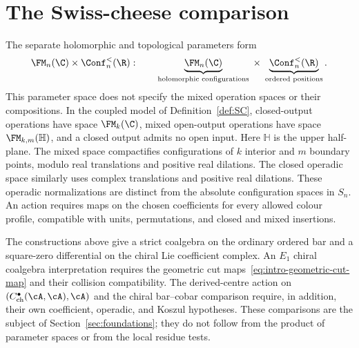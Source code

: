 \section*{The Swiss-cheese comparison}

The separate holomorphic and topological parameters form
\[
 \FM_n(\C) \times \Conf_n^<(\R):
 \qquad
 \underbrace{\FM_n(\C)}_{\text{holomorphic configurations}}
 \;\times\;
 \underbrace{\Conf_n^<(\R)}_{\text{ordered positions}}.
\]
This parameter space does not specify the mixed operation spaces
or their compositions. In the coupled model of
Definition~\ref{def:SC}, closed-output operations have space
$\FM_k(\C)$, mixed open-output operations have space
$\FM_{k,m}(\mathbb H)$, and a closed output admits no open input.
Here $\mathbb H$ is the upper half-plane. The mixed space
compactifies configurations of $k$ interior and $m$ boundary
points, modulo real translations and positive real dilations.
The closed operadic space similarly uses complex translations
and positive real dilations. These operadic normalizations
are distinct from the absolute configuration spaces in $S_n$.
An action requires maps on the chosen coefficients for every
allowed colour profile, compatible with units, permutations,
and closed and mixed insertions.

The constructions above give a strict coalgebra on the ordinary
ordered bar and a square-zero differential on the chiral Lie
coefficient complex. An $E_1$ chiral coalgebra interpretation
requires the geometric cut maps~\eqref{eq:intro-geometric-cut-map}
and their collision compatibility. The derived-centre action on
$(C^\bullet_{\mathrm{ch}}(\cA,\cA),\cA)$ and the chiral
bar--cobar comparison require, in addition, their own coefficient,
operadic, and Koszul hypotheses. These comparisons are the
subject of Section~\ref{sec:foundations}; they do not follow from
the product of parameter spaces or from the local residue tests.

